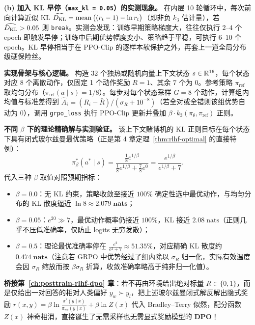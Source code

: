 \textbf{(b) 加入 KL 早停（\texttt{max\_kl = 0.05}）的实测现象。} 在内层 10 轮循环中，每次前向计算近似 KL $\widehat{D_{\mathrm{KL}}} = \operatorname{mean}\big((r_t - 1) - \ln r_t\big)$（即非负 $k_3$ 估计量），若 $\widehat{D_{\mathrm{KL}}} > 0.05$ 则 \texttt{break}。实测会发现：训练早期策略梯度大，往往仅执行 $2\text{--}4$ 个 epoch 即触发早停；训练中后期优势幅度变小、策略趋于平稳，可执行 $6\text{--}10$ 个 epoch。KL 早停相当于在 PPO-Clip 的逐样本软保护之外，再套上一道全局分布级硬保险丝。


\textbf{实现骨架与核心逻辑。} 构造 32 个独热或随机向量上下文状态 $s \in \mathbb{R}^{16}$，每个状态对应 8 个离散动作，仅固定 1 个动作奖励 $R = 1$、其余 $7$ 个为 $0$。参考策略 $\pi_{\mathrm{ref}}$ 取均匀分布（$\pi_{\mathrm{ref}}(a \mid s) = 1/8$）。每步对每个状态采样 $G = 8$ 个动作，计算组内均值与标准差得到 $\hat{A}_i = (R_i - \bar{R}) / (\sigma_R + 10^{-8})$（若全对或全错则该组优势自动为 $0$），调用 \texttt{grpo\_loss} 执行 PPO-Clip 更新并叠加 $\beta \cdot k_3(\pi_\theta, \pi_{\mathrm{ref}})$ 正则。

\textbf{不同 $\beta$ 下的理论精确解与实测验证。} 该上下文赌博机的 KL 正则目标在每个状态下具有闭式玻尔兹曼最优策略（正是第 4 章定理~\ref{thm:rlhf-optimal} 的直接特例）：
\[
  \pi_\beta^*(a^* \mid s) = \frac{\frac{1}{8} e^{1/\beta}}{\frac{1}{8} e^{1/\beta} + \frac{7}{8} e^{0}} = \frac{e^{1/\beta}}{e^{1/\beta} + 7}.
\]
代入三种 $\beta$ 取值对照预期指标：
\begin{itemize}
  \item $\beta = 0.0$：无 KL 约束，策略收敛至接近 $100\%$ 确定性选中最优动作，与均匀分布的 KL 散度逼近 $\ln 8 \approx \mathbf{2.079\;\text{nats}}$；
  \item $\beta = 0.05$：$e^{20} \gg 7$，最优动作概率仍接近 $100\%$，KL 接近 $2.08\;\text{nats}$（正则几乎不压低准确率，仅防止 logits 无穷发散）；
  \item $\beta = 0.5$：理论最优准确率停在 $\frac{e^2}{e^2 + 7} \approx \mathbf{51.35\%}$，对应精确 KL 散度约 $\mathbf{0.474\;\text{nats}}$（注意若 GRPO 中优势经过了组内除以 $\sigma_R$ 归一化，实际有效温度会因 $\sigma_R$ 缩放而按 $\beta \sigma_R$ 折算，收敛准确率略高于纯非归一化值）。
\end{itemize}
\textbf{桥接第~\ref{ch:posttrain-rlhf-dpo} 章}：若不再由环境给出绝对标量 $R \in \{0, 1\}$，而是仅给出一对回答的相对人类偏好 $y_w \succ y_l$，把上述玻尔兹曼闭式解反解出隐式奖励 $r(x, y) = \beta \ln\frac{\pi^*(y\mid x)}{\pi_{\mathrm{ref}}(y\mid x)} + \beta \ln Z(x)$ 代入 Bradley--Terry 似然，配分函数 $Z(x)$ 神奇相消，直接诞生了无需采样也无需显式奖励模型的 \textbf{DPO}！

